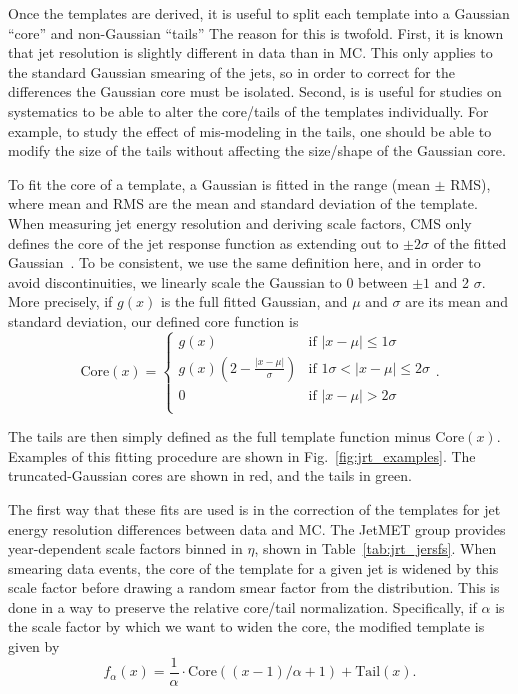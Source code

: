 Once the templates are derived, it is useful to split each template into a Gaussian ``core'' and
non-Gaussian ``tails'' The reason for this is twofold. First, it is known that jet resolution
is slightly different in data than in MC. This only applies to the standard Gaussian smearing of the jets,
so in order to correct for the differences the Gaussian core must be isolated.
Second, is is useful for studies on systematics to be able to alter the core/tails of the
templates individually. For example, to study the effect of mis-modeling in the tails,
one should be able to modify the size of the tails without affecting the size/shape
of the Gaussian core.

To fit the core of a template, a Gaussian is fitted in the range (mean $\pm$ RMS), where mean and RMS
are the mean and standard deviation of the template.
When measuring jet energy resolution and deriving scale factors, CMS only defines the core
of the jet response function as extending out to $\pm2\sigma$ of the fitted Gaussian~\cite{JME_jes_jer}.
To be consistent, we use the same definition here, and in order to avoid discontinuities,
we linearly scale the Gaussian to 0 between $\pm1$ and 2 $\sigma$. More precisely, if $g(x)$ is the
full fitted Gaussian, and $\mu$ and $\sigma$ are its mean and standard deviation, our defined core function is
\[
\text{Core}(x) = 
\begin{cases}
g(x) & \text{if } |x-\mu| \leq 1\sigma \\
g(x)\left(2-\frac{|x-\mu|}{\sigma}\right) & \text{if } 1\sigma < |x-\mu| \leq 2\sigma \\
0 & \text{if } |x-\mu| > 2\sigma \\
\end{cases}.
\]

The tails are then simply defined as the full template function minus $\text{Core}(x)$.
Examples of this fitting procedure are shown in Fig.~\ref{fig:jrt_examples}. The truncated-Gaussian
cores are shown in red, and the tails in green.

The first way that these fits are used is in the correction of the templates for jet energy resolution
differences between data and MC. The JetMET group provides year-dependent scale factors binned in 
$\eta$, shown in Table~\ref{tab:jrt_jersfs}. When smearing data events, the core of the template for a given jet
is widened by this scale factor before drawing a random smear factor from the distribution. This is done in a 
way to preserve the relative core/tail normalization. Specifically, if $\alpha$ is the scale factor by which we
want to widen the core, the modified template is given by
\[
f_\alpha(x) = \frac{1}{\alpha}\cdot\text{Core}((x-1)/\alpha+1) + \text{Tail}(x).
\]

